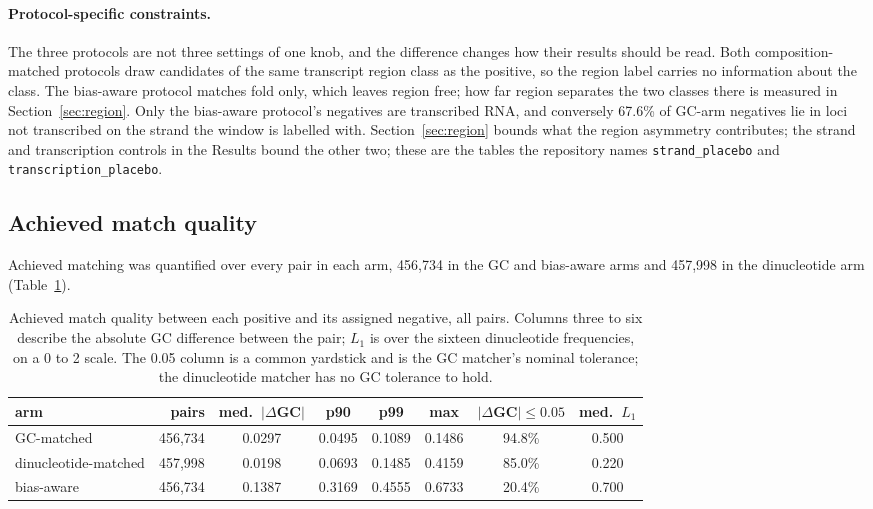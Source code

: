 \paragraph{Protocol-specific constraints.} The three protocols are not three settings of one
knob, and the difference changes how their results should be read. Both composition-matched
protocols draw candidates of the same transcript region class as the positive, so the region
label carries no information about the class. The bias-aware protocol matches fold only, which
leaves region free; how far region separates the two classes there is measured in
Section~\ref{sec:region}. Only the bias-aware
protocol's negatives are transcribed RNA, and conversely 67.6\% of GC-arm negatives lie in loci
not transcribed on the strand the window is labelled with. Section~\ref{sec:region} bounds what
the region asymmetry contributes; the strand and
transcription controls in the Results bound the other two; these are the tables the
repository names \texttt{strand\_placebo} and \texttt{transcription\_placebo}.

\subsection{Achieved match quality}
\label{sec:matchquality}

Achieved matching was quantified over every pair in each arm, 456{,}734 in the GC and
bias-aware arms and 457{,}998 in the dinucleotide arm (Table~\ref{tab:match}).

\begin{table}[htbp]
\centering
\caption{Achieved match quality between each positive and its assigned negative, all pairs.
Columns three to six describe the absolute GC difference between the pair; $L_1$ is over the
sixteen dinucleotide frequencies, on a 0 to 2 scale. The 0.05 column is a common yardstick and
is the GC matcher's nominal tolerance; the dinucleotide matcher has no GC tolerance to hold.}
\label{tab:match}
\small
\begin{tabular}{lrcccccc}
\toprule
arm & pairs & med.\ $|\Delta$GC$|$ & p90 & p99 & max & $|\Delta$GC$|\le0.05$ & med.\ $L_1$ \\
\midrule
GC-matched & 456{,}734 & 0.0297 & 0.0495 & 0.1089 & 0.1486 & 94.8\% & 0.500 \\
dinucleotide-matched & 457{,}998 & 0.0198 & 0.0693 & 0.1485 & 0.4159 & 85.0\% & 0.220 \\
bias-aware & 456{,}734 & 0.1387 & 0.3169 & 0.4555 & 0.6733 & 20.4\% & 0.700 \\
\bottomrule
\end{tabular}
\end{table}

